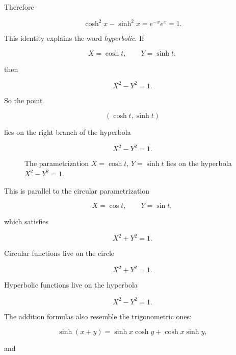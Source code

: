 Therefore

\[
\cosh^2x-\sinh^2x=e^{-x}e^x=1.
\]

This identity explains the word \emph{hyperbolic}.  If

\[
X=\cosh t,
\qquad
Y=\sinh t,
\]

then

\[
X^2-Y^2=1.
\]

So the point

\[
(\cosh t,\sinh t)
\]

lies on the right branch of the hyperbola

\[
X^2-Y^2=1.
\]

\begin{figure}[h]
\centering
{}
\caption{The parametrization \(X=\cosh t\), \(Y=\sinh t\) lies on the hyperbola \(X^2-Y^2=1\).}
\label{fig:hyperbola-cosh-sinh}
\end{figure}

This is parallel to the circular parametrization

\[
X=\cos t,
\qquad
Y=\sin t,
\]

which satisfies

\[
X^2+Y^2=1.
\]

Circular functions live on the circle

\[
X^2+Y^2=1.
\]

Hyperbolic functions live on the hyperbola

\[
X^2-Y^2=1.
\]

The addition formulas also resemble the trigonometric ones:

\[
\boxed{
\sinh(x+y)=\sinh x\cosh y+\cosh x\sinh y,
}
\]

and

